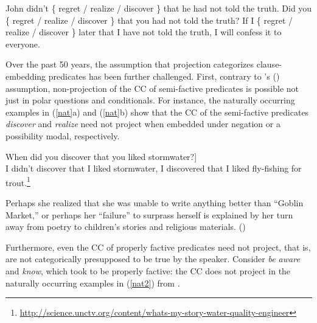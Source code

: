 \documentclass[11pt,fleqn]{article}
\newcommand{\6}{\mbox{$[\hspace*{-.6mm}[$}}
\newcommand{\9}{\mbox{$]\hspace*{-.6mm}]$}}
\newcommand{\citetpos}[1]{\citeauthor{#1}'s (\citeyear{#1})}
\begin{document}
\begin{exe}
\ex\label{kart2} \citealt[63f.]{karttunen71b}
\begin{xlist}
\ex John didn't \{ regret / realize / discover \} that he had not told the truth.
\ex  Did you \{ regret / realize / discover \} that you had not told the truth?
\ex  If I \{ regret / realize / discover \} later that I have not told the truth, I will confess it to everyone.
\end{xlist}
\end{exe}

Over the past 50 years, the assumption that projection categorizes clause-embedding predicates has been further challenged. First, contrary to \citetpos{karttunen71b} assumption, non-projection of the CC of semi-factive predicates is possible not just in polar questions and conditionals. For instance, the naturally occurring examples in (\ref{nat}a) and (\ref{nat}b) show that the CC of the semi-factive predicates {\em discover} and {\em realize} need not project when embedded under negation or a possibility modal, respectively.

\begin{exe}
\ex\label{nat} 
\begin{xlist}

\ex {[}When did you discover that you liked stormwater?] \\ I didn't discover that I liked stormwater, I discovered that I liked fly-fishing for trout.\footnote{\url{http://science.unctv.org/content/whats-my-story-water-quality-engineer}}

\ex Perhaps she realized that she was unable to write anything better than ``Goblin Market,'' or perhaps her ``failure'' to surprass herself is explained by her turn away from poetry to children's stories and religious materials. \hfill (\citealt[87]{beaver-belly})

\end{xlist}

\end{exe}
Furthermore, even the CC of properly factive predicates need not project, that is, are not categorically presupposed to be true by the speaker. Consider {\em be aware} and {\em know}, which \citet{karttunen71b} took to be properly factive: the CC does not project in the naturally occurring examples in (\ref{nat2}) from \citealt{beaver-belly}.
\end{document}

